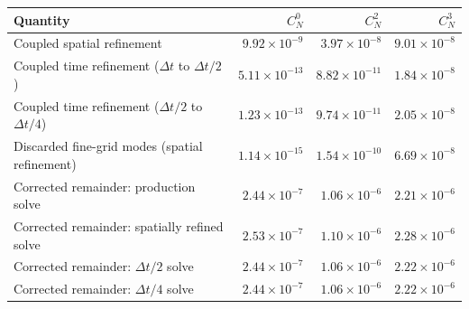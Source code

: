\begin{tabular}{lrrr}
\toprule
Quantity & $C_N^0$ & $C_N^2$ & $C_N^3$\\
\midrule
Coupled spatial refinement & $9.92\times10^{-9}$ & $3.97\times10^{-8}$ & $9.01\times10^{-8}$\\
Coupled time refinement ($\Delta t$ to $\Delta t/2$) & $5.11\times10^{-13}$ & $8.82\times10^{-11}$ & $1.84\times10^{-8}$\\
Coupled time refinement ($\Delta t/2$ to $\Delta t/4$) & $1.23\times10^{-13}$ & $9.74\times10^{-11}$ & $2.05\times10^{-8}$\\
Discarded fine-grid modes (spatial refinement) & $1.14\times10^{-15}$ & $1.54\times10^{-10}$ & $6.69\times10^{-8}$\\
Corrected remainder: production solve & $2.44\times10^{-7}$ & $1.06\times10^{-6}$ & $2.21\times10^{-6}$\\
Corrected remainder: spatially refined solve & $2.53\times10^{-7}$ & $1.10\times10^{-6}$ & $2.28\times10^{-6}$\\
Corrected remainder: $\Delta t/2$ solve & $2.44\times10^{-7}$ & $1.06\times10^{-6}$ & $2.22\times10^{-6}$\\
Corrected remainder: $\Delta t/4$ solve & $2.44\times10^{-7}$ & $1.06\times10^{-6}$ & $2.22\times10^{-6}$\\
\bottomrule
\end{tabular}
